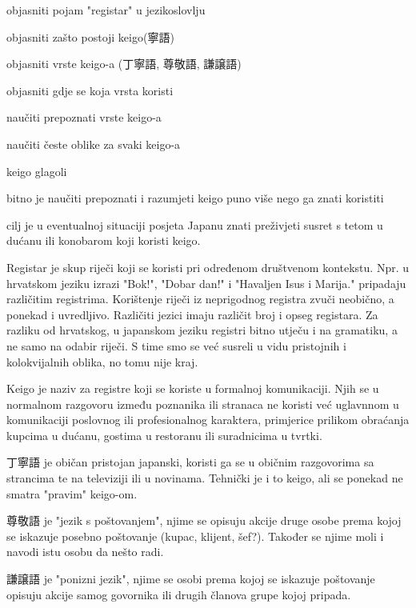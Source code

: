 
\author{Ivan Petranović}

	
	
	\begin{hyou}
		\item objasniti pojam "registar" u jezikoslovlju
		\item objasniti zašto postoji keigo(寧語)
		\item objasniti vrste keigo-a (丁寧語, 尊敬語, 謙譲語)
		\item objasniti gdje se koja vrsta koristi
		\item naučiti prepoznati vrste keigo-a
		\item naučiti česte oblike za svaki keigo-a
		\item keigo glagoli
	\end{hyou}

	
	\begin{hyou}
		\item bitno je naučiti prepoznati i razumjeti keigo puno više nego ga znati koristiti
		\item cilj je u eventualnoj situaciji posjeta Japanu znati preživjeti susret s tetom u dućanu ili konobarom koji koristi keigo.
	\end{hyou}

	
	Registar je skup riječi koji se koristi pri određenom društvenom kontekstu. Npr. u hrvatskom jeziku izrazi "Bok!", "Dobar dan!" i "Havaljen Isus i Marija." pripadaju različitim registrima. Korištenje riječi iz neprigodnog registra zvuči neobično, a ponekad i uvredljivo. Različiti jezici imaju različit broj i opseg registara. Za razliku od hrvatskog, u japanskom jeziku registri bitno utječu i na gramatiku, a ne samo na odabir riječi. S time smo se već susreli u vidu pristojnih i kolokvijalnih oblika, no tomu nije kraj.
	
	Keigo je naziv za registre koji se koriste u formalnoj komunikaciji. Njih se u normalnom razgovoru između poznanika ili stranaca ne koristi već uglavnnom u komunikaciji poslovnog ili profesionalnog karaktera, primjerice prilikom obraćanja kupcima u dućanu, gostima u restoranu ili suradnicima u tvrtki.
	
	丁寧語 je običan pristojan japanski, koristi ga se u običnim razgovorima sa strancima te na televiziji ili u novinama. Tehnički je i to keigo, ali se ponekad ne smatra "pravim" keigo-om.
	
	尊敬語 je "jezik s poštovanjem", njime se opisuju akcije druge osobe prema kojoj se iskazuje posebno poštovanje (kupac, klijent, šef?). Također se njime moli i navodi istu osobu da nešto radi.
	
	謙譲語 je "ponizni jezik", njime se osobi prema kojoj se iskazuje poštovanje opisuju akcije samog govornika ili drugih članova grupe kojoj pripada.
